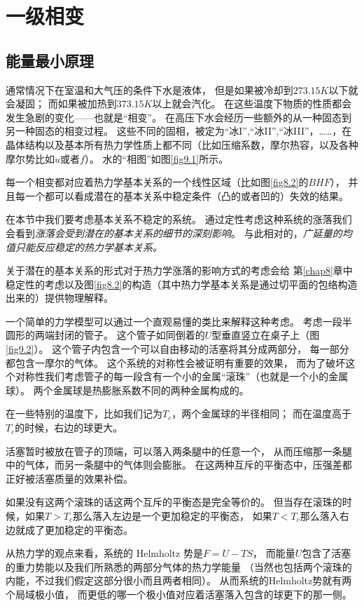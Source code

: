 \chapter{一级相变}
\label{chap9}

\section{能量最小原理}
\label{sec9.1}

通常情况下在室温和大气压的条件下水是液体，
但是如果被冷却到$273.15K$以下就会凝固；
而如果被加热到$373.15K$以上就会汽化。
在这些温度下物质的性质都会发生急剧的变化——也就是“相变”。
在高压下水会经历一些额外的从一种固态到另一种固态的相变过程。
这些不同的固相，被定为“冰I”,“冰II”,“冰III”，……，在晶体结构以及基本所有热力学性质上都不同（比如压缩系数，摩尔热容，以及各种摩尔势比如$u$或者$f$）。
水的“相图”如图\ref{fig9.1}所示。

每一个相变都对应着热力学基本关系的一个线性区域（比如图\ref{fig8.2}的$BHF$），
并且每一个都可以看成潜在的基本关系中稳定条件（凸的或者凹的）失效的结果。

在本节中我们要考虑基本关系不稳定的系统。
通过定性考虑这种系统的涨落我们会看到{\it 涨落会受到潜在的基本关系的细节的深刻影响}。
与此相对的，{\it 广延量的均值只能反应稳定的热力学基本关系。}

关于潜在的基本关系的形式对于热力学涨落的影响方式的考虑会给
第\ref{chap8}章中稳定性的考虑以及图\ref{fig8.2}的构造（其中热力学基本关系是通过切平面的包络构造出来的）提供物理解释。

一个简单的力学模型可以通过一个直观易懂的类比来解释这种考虑。
考虑一段半圆形的两端封闭的管子。
这个管子如同倒着的$U$型垂直竖立在桌子上（图\ref{fig9.2}）。
这个管子内包含一个可以自由移动的活塞将其分成两部分，
每一部分都包含一摩尔的气体。
这个系统的对称性会被证明有重要的效果，
而为了破坏这个对称性我们考虑管子的每一段含有一个小的金属“滚珠”（也就是一个小的金属球）。
两个金属球是热膨胀系数不同的两种金属构成的。

在一些特别的温度下，比如我们记为$T_c$，两个金属球的半径相同；
而在温度高于$T_c$的时候，右边的球更大。

活塞暂时被放在管子的顶端，可以落入两条腿中的任意一个，
从而压缩那一条腿中的气体，而另一条腿中的气体则会膨胀。
在这两种互斥的平衡态中，压强差都正好被活塞质量的效果补偿。

如果没有这两个滚珠的话这两个互斥的平衡态是完全等价的。
但当存在滚珠的时候，如果$T>T_c$那么落入左边是一个更加稳定的平衡态，
如果$T<T_c$那么落入右边就成了更加稳定的平衡态。

从热力学的观点来看，系统的 Helmholtz 势是$F=U-TS$，
而能量$U$包含了活塞的重力势能以及我们所熟悉的两部分气体的热力学能量
（当然也包括两个滚珠的内能，不过我们假定这部分很小而且两者相同）。
从而系统的Helmholtz势就有两个局域极小值，
而更低的哪一个极小值对应着活塞落入包含的球更下的那一侧。

